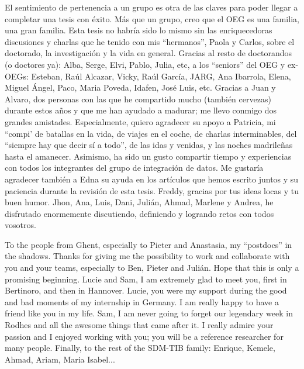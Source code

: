 \begin{acknowledgementslong}
El sentimiento de pertenencia a un grupo es otra de las claves para poder llegar a completar una tesis con éxito. Más que un grupo, creo que el OEG es una familia, una gran familia. Esta tesis no habría sido lo mismo sin las enriquecedoras discusiones y charlas que he tenido con mis ``hermanos'', Paola y Carlos, sobre el doctorado, la investigación y la vida en general. Gracias al resto de doctorandos (o doctores ya): Alba, Serge, Elvi, Pablo, Julia, etc, a los ``seniors'' del OEG y ex-OEGs: Esteban, Raúl Alcazar, Vicky, Raúl García, JARG, Ana Ibarrola, Elena, Miguel Ángel, Paco, Maria Poveda, Idafen, José Luis, etc. Gracias a Juan y Alvaro, dos personas con las que he compartido mucho (también cervezas) durante estos años y que me han ayudado a madurar; me llevo conmigo dos grandes amistades. Especialmente, quiero agradecer su apoyo a Patricia, mi ``compi' de batallas en la vida, de viajes en el coche, de charlas interminables, del ``siempre hay que decir sí a todo'', de las idas y venidas, y las noches madrileñas hasta el amanecer. Asimismo, ha sido un gusto compartir tiempo y experiencias con todos los integrantes del grupo de integración de datos. Me gustaría agradecer también a Edna su ayuda en los artículos que hemos escrito juntos y su paciencia durante la revisión de esta tesis. Freddy, gracias por tus ideas locas y tu buen humor. Jhon, Ana, Luis, Dani, Julián, Ahmad, Marlene y Andrea, he disfrutado enormemente discutiendo, definiendo y logrando retos con todos vosotros. 

To the people from Ghent, especially to Pieter and Anastasia, my ``postdocs'' in the shadows. Thanks for giving me the possibility to work and collaborate with you and your teams, especially to Ben, Pieter and Julián. Hope that this is only a promising beginning. Lucie and Sam, I am extremely glad to meet you, first in Bertinoro, and then in Hannover. Lucie, you were my support during the good and bad moments of my internship in Germany. I am really happy to have a friend like you in my life. Sam, I am never going to forget our legendary week in Rodhes and all the awesome things that came after it. I really admire your passion and I enjoyed working with you; you will be a reference researcher for many people. Finally, to the rest of the SDM-TIB family: Enrique, Kemele, Ahmad, Ariam, Maria Isabel...


\end{acknowledgementslong}

